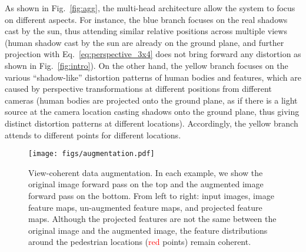 \documentclass[sigconf,authorversion,nonacm]{acmart}
\begin{document}
As shown in Fig.~\ref{fig:agg}, the multi-head architecture allow the system to focus on different aspects. 
For instance, the blue branch focuses on the real shadows cast by the sun, thus attending similar relative positions across multiple views (human shadow cast by the sun are already on the ground plane, and further projection with Eq.~\ref{eq:perspective_3x4} does not bring forward any distortion as shown in Fig.~\ref{fig:intro}).
On the other hand, the yellow branch focuses on the various ``shadow-like'' distortion patterns of human bodies and features, which are caused by perspective transformations at different positions from different cameras
(human bodies are projected onto the ground plane, as if there is a light source at the camera location casting shadows onto the ground plane, thus giving distinct distortion patterns at different locations). Accordingly, the yellow branch attends to different points for different locations. 







\begin{figure*}[h]
  \centering
  \texttt{[image: figs/augmentation.pdf]}
  \caption{
  View-coherent data augmentation. In each example, we show the original image forward pass on the top and the augmented image forward pass on the bottom. From left to right: input images, image feature maps, un-augmented feature maps, and projected feature maps. Although the projected features are not the same between the original image and the augmented image, the feature distributions around the pedestrian locations (\textcolor{red}{red} points) remain coherent. 
  }
  \label{fig:aug}
\end{figure*}
\end{document}
